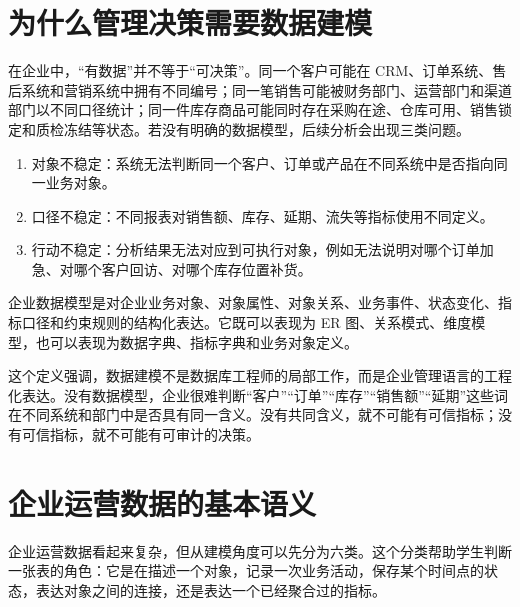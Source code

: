 \documentclass[UTF8,fontset=fandol,openany,zihao=-4]{ctexbook}
\begin{document}
\section{为什么管理决策需要数据建模}

在企业中，“有数据”并不等于“可决策”。同一个客户可能在 CRM、订单系统、售后系统和营销系统中拥有不同编号；同一笔销售可能被财务部门、运营部门和渠道部门以不同口径统计；同一件库存商品可能同时存在采购在途、仓库可用、销售锁定和质检冻结等状态。若没有明确的数据模型，后续分析会出现三类问题。

\begin{enumerate}
  \item 对象不稳定：系统无法判断同一个客户、订单或产品在不同系统中是否指向同一业务对象。
  \item 口径不稳定：不同报表对销售额、库存、延期、流失等指标使用不同定义。
  \item 行动不稳定：分析结果无法对应到可执行对象，例如无法说明对哪个订单加急、对哪个客户回访、对哪个库存位置补货。
\end{enumerate}

\begin{definition}[企业数据模型]
企业数据模型是对企业业务对象、对象属性、对象关系、业务事件、状态变化、指标口径和约束规则的结构化表达。它既可以表现为 ER 图、关系模式、维度模型，也可以表现为数据字典、指标字典和业务对象定义。
\end{definition}

这个定义强调，数据建模不是数据库工程师的局部工作，而是企业管理语言的工程化表达。没有数据模型，企业很难判断“客户”“订单”“库存”“销售额”“延期”这些词在不同系统和部门中是否具有同一含义。没有共同含义，就不可能有可信指标；没有可信指标，就不可能有可审计的决策。

\section{企业运营数据的基本语义}

企业运营数据看起来复杂，但从建模角度可以先分为六类。这个分类帮助学生判断一张表的角色：它是在描述一个对象，记录一次业务活动，保存某个时间点的状态，表达对象之间的连接，还是表达一个已经聚合过的指标。
\end{document}
